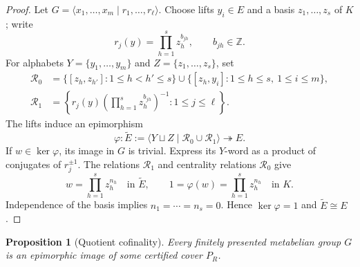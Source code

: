 \documentclass[12pt]{article}
\numberwithin{equation}{section}
\newtheorem{proposition}[theorem]{Proposition}
\theoremstyle{definition}
\theoremstyle{remark}
\newcommand{\Z}{\mathbb Z}
\newcommand{\epito}{\twoheadrightarrow}
\begin{document}
\begin{proof}
Let $G=\langle x_1,\ldots,x_m\mid r_1,\ldots,r_\ell\rangle$.
Choose lifts $y_i\in E$ and a basis $z_1,\ldots,z_s$ of $K$; write
\[
 r_j(y)=\prod_{h=1}^{s}z_h^{b_{jh}},\qquad b_{jh}\in\Z.
\]
For alphabets $Y=\{y_1,\ldots,y_m\}$ and $Z=\{z_1,\ldots,z_s\}$, set
\begin{align*}
 \mathcal R_0
 &=\{[z_h,z_{h'}]:1\le h<h'\le s\}
   \cup\{[z_h,y_i]:1\le h\le s,\ 1\le i\le m\},\\[3pt]
 \mathcal R_1
 &=\left\{r_j(y)\left(\prod_{h=1}^{s}z_h^{b_{jh}}\right)^{-1}
                    :1\le j\le\ell\right\}.
\end{align*}
The lifts induce an epimorphism
\[
 \varphi:\widetilde E:=
 \langle Y\sqcup Z\mid\mathcal R_0\cup\mathcal R_1\rangle
 \epito E.
\]
If $w\in\ker\varphi$, its image in $G$ is trivial. Express its
$Y$-word as a product of conjugates of $r_j^{\pm1}$. The relations
$\mathcal R_1$ and centrality relations $\mathcal R_0$ give
\[
 w=\prod_{h=1}^{s}z_h^{n_h}\quad\text{in }\widetilde E,
 \qquad
 1=\varphi(w)=\prod_{h=1}^{s}z_h^{n_h}\quad\text{in }K.
\]
Independence of the basis implies $n_1=\cdots=n_s=0$. Hence
$\ker\varphi=1$ and $\widetilde E\cong E$.
\end{proof}

\begin{proposition}[Quotient cofinality]
\label{prop:cofinal}
Every finitely presented metabelian group $G$ is an epimorphic image
of some certified cover $P_R$.
\end{proposition}
\end{document}
